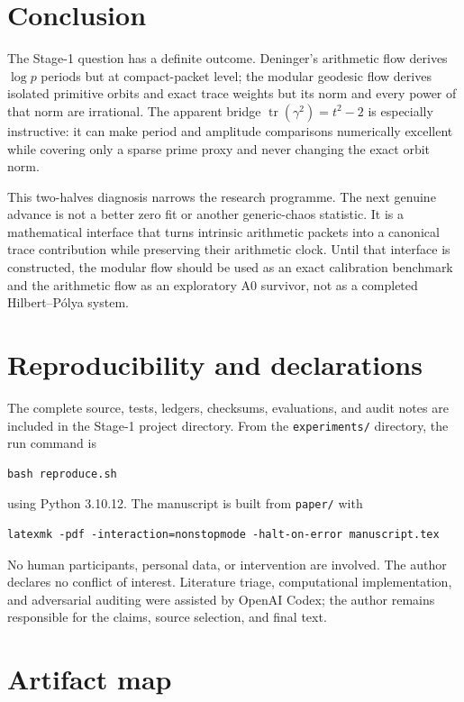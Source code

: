 \documentclass[11pt]{article}
\theoremstyle{definition}
\theoremstyle{remark}
\newcommand{\Tr}{\operatorname{tr}}
\begin{document}
\section{Conclusion}

The Stage-1 question has a definite outcome.  Deninger's arithmetic flow
derives \(\log p\) periods but at compact-packet level; the modular geodesic
flow derives isolated primitive orbits and exact trace weights but its norm and
every power of that norm are irrational.  The apparent bridge
\(\Tr(\gamma^2)=t^2-2\) is especially instructive: it can make period and
amplitude comparisons numerically excellent while covering only a sparse
prime proxy and never changing the exact orbit norm.

This two-halves diagnosis narrows the research programme.  The next genuine
advance is not a better zero fit or another generic-chaos statistic.  It is a
mathematical interface that turns intrinsic arithmetic packets into a
canonical trace contribution while preserving their arithmetic clock.  Until
that interface is constructed, the modular flow should be used as an exact
calibration benchmark and the arithmetic flow as an exploratory A0 survivor,
not as a completed Hilbert--P\'olya system.

\section*{Reproducibility and declarations}

The complete source, tests, ledgers, checksums, evaluations, and audit notes
are included in the Stage-1 project directory.  From the
\texttt{experiments/} directory, the run command is
\begin{verbatim}
bash reproduce.sh
\end{verbatim}
using Python 3.10.12.  The manuscript is built from \texttt{paper/} with
\begin{verbatim}
latexmk -pdf -interaction=nonstopmode -halt-on-error manuscript.tex
\end{verbatim}
No human participants, personal data, or intervention are involved.  The
author declares no conflict of interest.  Literature triage, computational
implementation, and adversarial auditing were assisted by OpenAI Codex; the
author remains responsible for the claims, source selection, and final text.

\appendix
\section{Artifact map}
\end{document}
